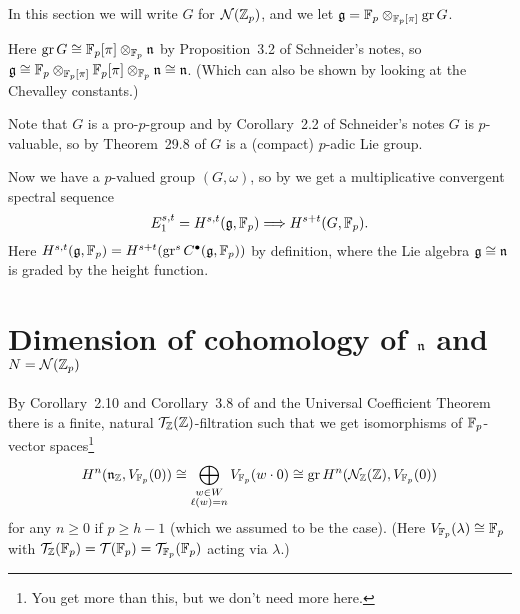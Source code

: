 In this section we will write $G$ for $\mathcal{N}(\mathbb{Z}_p)$, and we let $\mathfrak{g} = \mathbb{F}_p \otimes_{\mathbb{F}_p[\pi]} \operatorname{gr} G$.

Here $\operatorname{gr} G \cong \mathbb{F}_p[\pi] \otimes_{\mathbb{F}_p} \mathfrak{n}$ by Proposition~3.2 of Schneider's notes, so $\mathfrak{g} \cong \mathbb{F}_p \otimes_{\mathbb{F}_p[\pi]} \mathbb{F}_p[\pi] \otimes_{\mathbb{F}_p} \mathfrak{n} \cong \mathfrak{n}$. (Which can also be shown by looking at the Chevalley constants.)

Note that $G$ is a pro-$p$-group and by Corollary~2.2 of Schneider's notes $G$ is $p$-valuable, so by Theorem~29.8 of \cite{Sch} $G$ is a (compact) $p$-adic Lie group. 

Now we have a $p$-valued group $(G,\omega)$, so by \cite{Sor} we get a multiplicative convergent spectral sequence
\begin{equation*}
  E_{1}^{s,t} = H^{s,t}(\mathfrak{g},\mathbb{F}_p) \Longrightarrow H^{s+t}(G,\mathbb{F}_p).
\end{equation*}
Here $H^{s,t}(\mathfrak{g},\mathbb{F}_p) = H^{s+t}(\operatorname{gr}^{s} C^\bullet(\mathfrak{g},\mathbb{F}_p))$ by definition, where the Lie algebra $\mathfrak{g} \cong \mathfrak{n}$ is graded by the height function.

\section{Dimension of cohomology of \texorpdfstring{$\mathfrak{n}$}{n} and \texorpdfstring{$N=\mathcal{N}(\mathbb{Z}_p)$}{N=NZp}}\label{sec:dimofcoh}
By Corollary~2.10 and Corollary~3.8 of \cite{PT} and the Universal Coefficient Theorem there is a finite, natural $\mathcal{T}_{\mathbb{Z}}(\mathbb{Z})$-filtration such that we get isomorphisms of $\mathbb{F}_p$-vector spaces\footnote{You get more than this, but we don't need more here.}
\begin{equation*}
  H^{n}(\mathfrak{n}_{\mathbb{Z}},V_{\mathbb{F}_p}(0)) \cong \bigoplus_{\substack{w \in W \\ \ell(w) = n}} V_{\mathbb{F}_p}(w \cdot 0) \cong \operatorname{gr} H^{n}(\mathcal{N}_{\mathbb{Z}}(\mathbb{Z}),V_{\mathbb{F}_p}(0))
\end{equation*}
for any $n \geq 0$ if $p \geq h-1$ (which we assumed to be the case). (Here $V_{\mathbb{F}_p}(\lambda) \cong \mathbb{F}_p$ with $\mathcal{T}_{\mathbb{Z}}(\mathbb{F}_p) = \mathcal{T}(\mathbb{F}_p) = \mathcal{T}_{\mathbb{F}_p}(\mathbb{F}_p)$ acting via $\lambda$.)

